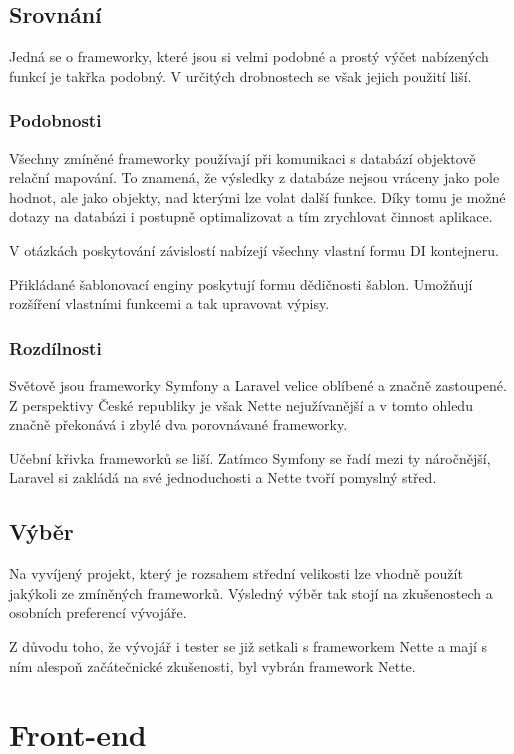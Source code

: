 \documentclass[czech,BP]{thesiskiv}
\begin{document}
	\subsection{Srovnání}
	\par Jedná se o frameworky, které jsou si velmi podobné a prostý výčet nabízených funkcí je takřka podobný. V určitých drobnostech se však jejich použití liší.
	\subsubsection{Podobnosti}
	\par Všechny zmíněné frameworky používají při komunikaci s databází objektově relační mapování. To znamená, že výsledky z databáze nejsou vráceny jako pole hodnot, ale jako objekty, nad kterými lze volat další funkce. Díky tomu je možné dotazy na databázi i postupně optimalizovat a tím zrychlovat činnost aplikace.
	\par V otázkách poskytování závislostí nabízejí všechny vlastní formu DI kontejneru.
	\par Přikládané šablonovací enginy poskytují formu dědičnosti šablon. Umožňují rozšíření vlastními funkcemi a tak upravovat výpisy.
	\subsubsection{Rozdílnosti}
	\par Světově jsou frameworky Symfony a Laravel velice oblíbené a značně zastoupené. Z perspektivy České republiky je však Nette nejužívanější a v tomto ohledu značně překonává i zbylé dva porovnávané frameworky.
	\par Učební křivka frameworků se liší. Zatímco Symfony se řadí mezi ty náročnější, Laravel si zakládá na své jednoduchosti a Nette tvoří pomyslný střed.
	\subsection{Výběr}
	\par Na vyvíjený projekt, který je rozsahem střední velikosti lze vhodně použít jakýkoli ze zmíněných frameworků. Výsledný výběr tak stojí na zkušenostech a osobních preferencí vývojáře.
	\par Z důvodu toho, že vývojář i tester se již setkali s frameworkem Nette a mají s ním alespoň začátečnické zkušenosti, byl vybrán framework Nette.
\section{Front-end}
\end{document}
